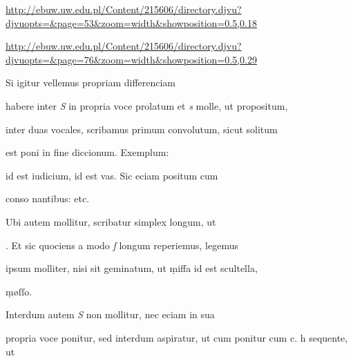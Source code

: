 
\newParkoszpage

{
\url{http://ebuw.uw.edu.pl/Content/215606/directory.djvu?djvuopts=&page=53&zoom=width&showposition=0.5,0.18}

\url{http://ebuw.uw.edu.pl/Content/215606/directory.djvu?djvuopts=&page=76&zoom=width&showposition=0.5,0.29}
}

\bigskip

\obeylines
\mono



\fullpreviouslines


{
\color{blue}



\indentK Si igitur vellemus propriam differenciam

\fulllines

habere inter \textit{S} in propria voce prolatum et \textit{s} molle, ut propositum,
}


\fulllines

inter duas vocales, scribamus primum convolutum, sicut solitum

est poni in fine diccionum. Exemplum:   

 id est iudicium,  id est vas. Sic eciam positum cum

conso nantibus:      etc.

Ubi autem mollitur, scribatur simplex longum, ut 

. Et sic quociens a modo \textit{ſ} longum reperiemus, legemus

ipsum molliter, nisi sit geminatum, ut ṃiffa id est scultella,

\splitlines

ṃøſſo.

\indentK Interdum autem \textit{S} non mollitur, nec eciam in sua

\fulllines

propria voce ponitur, sed interdum aspiratur, ut cum ponitur cum
 c. h sequente, ut   

\splitlines

